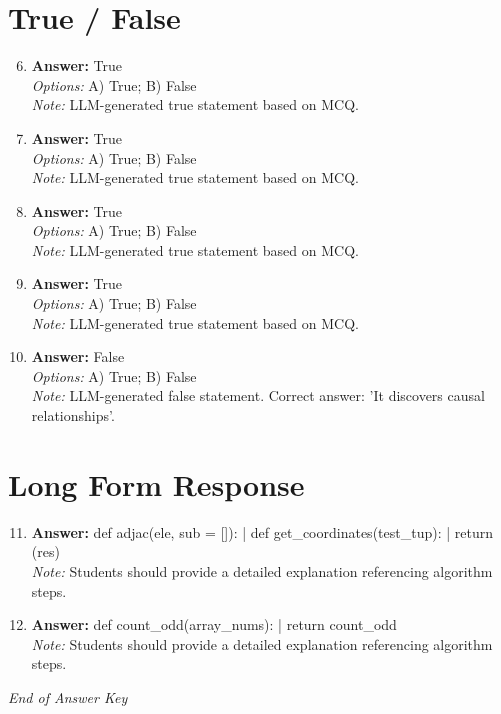 \documentclass[12pt]{article}
\begin{document}
\section*{True / False}
\begin{enumerate}[label=\arabic*.]
\setcounter{enumi}{5}
\item \textbf{Answer:} True
\\ \textit{Options:} A) True; B) False
\\ \textit{Note:} LLM-generated true statement based on MCQ.
\item \textbf{Answer:} True
\\ \textit{Options:} A) True; B) False
\\ \textit{Note:} LLM-generated true statement based on MCQ.
\item \textbf{Answer:} True
\\ \textit{Options:} A) True; B) False
\\ \textit{Note:} LLM-generated true statement based on MCQ.
\item \textbf{Answer:} True
\\ \textit{Options:} A) True; B) False
\\ \textit{Note:} LLM-generated true statement based on MCQ.
\item \textbf{Answer:} False
\\ \textit{Options:} A) True; B) False
\\ \textit{Note:} LLM-generated false statement. Correct answer: 'It discovers causal relationships'.
\end{enumerate}

\section*{Long Form Response}
\begin{enumerate}[label=\arabic*.]
\setcounter{enumi}{10}
\item \textbf{Answer:} def adjac(ele, sub = []): | def get\_coordinates(test\_tup): | return (res)
\\ \textit{Note:} Students should provide a detailed explanation referencing algorithm steps.
\item \textbf{Answer:} def count\_odd(array\_nums): | return count\_odd
\\ \textit{Note:} Students should provide a detailed explanation referencing algorithm steps.
\end{enumerate}

\vfill
\noindent\textit{End of Answer Key}
\end{document}
